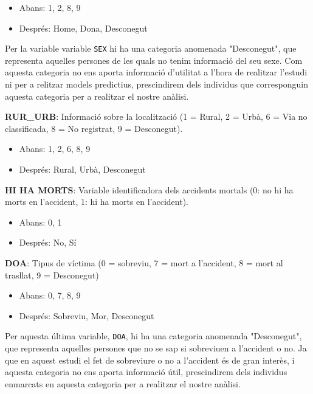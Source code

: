 \documentclass[11pt,longbibliography]{article}
\theoremstyle{definition}
\theoremstyle{remark}
\begin{document}
\begin{itemize}

\item Abans: 1, 2, 8, 9

\item Després: Home, Dona, Desconegut

\end{itemize}

Per la variable variable \texttt{SEX} hi ha una categoria anomenada "Desconegut", que representa aquelles persones de les quals no tenim informació del seu sexe. Com aquesta categoria no ens aporta informació d'utilitat a l'hora de realitzar l'estudi ni per a relitzar models predictius, prescindirem dels individus que corresponguin aquesta categoria per a realitzar el nostre anàlisi.

\textbf{RUR\_URB}: Informació sobre la localització (1 = Rural, 2 = Urbà, 6 = Via no classificada, 8 = No registrat, 9 = Desconegut). 

\begin{itemize}

\item Abans: 1, 2, 6, 8, 9

\item Després: Rural, Urbà, Desconegut

\end{itemize}


\textbf{HI HA MORTS}: Variable identificadora dels accidents mortals (0: no hi ha morts en l'accident, 1: hi ha morts en l'accident).


\begin{itemize}

\item Abans: 0, 1

\item  Després: No, Sí

\end{itemize}

\textbf{DOA}: Tipus de víctima (0 = sobreviu, 7 = mort a l’accident, 8 = mort al trasllat, 9 = Desconegut)

\begin{itemize}

\item  Abans: 0, 7, 8, 9

\item  Després: Sobreviu, Mor, Desconegut

\end{itemize}

Per aquesta última variable, \texttt{DOA}, hi ha una categoria anomenada "Desconegut", que representa aquelles persones que no se sap si sobreviuen a l'accident o no. Ja que en aquest estudi el fet de sobreviure o no a l'accident és de gran interès, i aquesta categoria  no ens aporta informació útil, prescindirem dels individus enmarcats en aquesta categoria per a realitzar el nostre anàlisi.
\end{document}
